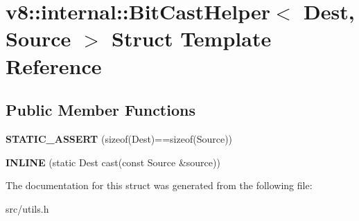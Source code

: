 \hypertarget{structv8_1_1internal_1_1_bit_cast_helper}{}\section{v8\+:\+:internal\+:\+:Bit\+Cast\+Helper$<$ Dest, Source $>$ Struct Template Reference}
\label{structv8_1_1internal_1_1_bit_cast_helper}
\subsection*{Public Member Functions}
\begin{DoxyCompactItemize}
\item 
\hypertarget{structv8_1_1internal_1_1_bit_cast_helper_a27e5a915040bf3d72ad82acc3c31f26d}{}{\bfseries S\+T\+A\+T\+I\+C\+\_\+\+A\+S\+S\+E\+R\+T} (sizeof(Dest)==sizeof(Source))\label{structv8_1_1internal_1_1_bit_cast_helper_a27e5a915040bf3d72ad82acc3c31f26d}

\item 
\hypertarget{structv8_1_1internal_1_1_bit_cast_helper_a254db2a6c172dd8af4b4f508c45869d4}{}{\bfseries I\+N\+L\+I\+N\+E} (static Dest cast(const Source \&source))\label{structv8_1_1internal_1_1_bit_cast_helper_a254db2a6c172dd8af4b4f508c45869d4}

\end{DoxyCompactItemize}


The documentation for this struct was generated from the following file\+:\begin{DoxyCompactItemize}
\item 
src/utils.\+h\end{DoxyCompactItemize}
